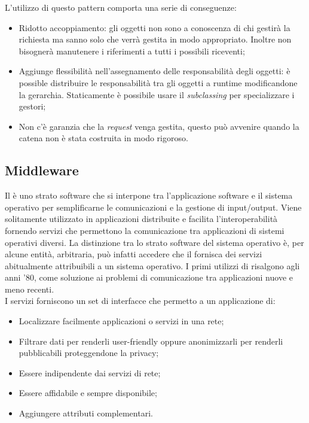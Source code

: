 	L'utilizzo di questo pattern comporta una serie di conseguenze:
		\begin{itemize}
			\item Ridotto accoppiamento: gli oggetti non sono a conoscenza di chi gestirà la richiesta ma sanno solo che verrà gestita in modo appropriato. Inoltre non bisognerà manutenere i riferimenti a tutti i possibili riceventi;
			\item Aggiunge flessibilità nell'assegnamento delle responsabilità degli oggetti: è possible distribuire le responsabilità tra gli oggetti a runtime modificandone la gerarchia. Staticamente è possibile usare il \emph{subclassing} per specializzare i gestori;
 			\item Non c'è garanzia che la \emph{request} venga gestita, questo può avvenire quando la catena non è stata costruita in modo rigoroso.
		\end{itemize}
	
		
	
	\subsection{Middleware} 
	Il  è uno strato software che si interpone tra l'applicazione software e il sistema operativo per semplificarne le comunicazioni e la gestione di input/output. Viene solitamente utilizzato in applicazioni distribuite e facilita l'interoperabilità fornendo servizi che permettono la comunicazione tra applicazioni di sistemi operativi diversi. La distinzione tra lo strato software del sistema operativo è, per alcune entità, arbitraria, può infatti accedere che il  fornisca dei servizi abitualmente attribuibili a un sistema operativo. I primi utilizzi di  risalgono agli anni '80, come soluzione ai problemi di comunicazione tra applicazioni nuove e meno recenti. \\
	I servizi  forniscono un set di interfacce che permetto a un applicazione di:
	
	\begin{itemize}
		\item Localizzare facilmente applicazioni o servizi in una rete;
		\item Filtrare dati per renderli user-friendly oppure anonimizzarli per renderli pubblicabili proteggendone la privacy;
		\item Essere indipendente dai servizi di rete;
		\item Essere affidabile e sempre disponibile;
		\item Aggiungere attributi complementari.
	\end{itemize}
	
